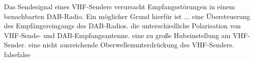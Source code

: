     {Das Sendesignal eines VHF-Senders verursacht Empfangsstörungen in einem benachbarten DAB-Radio. Ein möglicher Grund hierfür ist ...}
    {eine Übersteuerung des Empfängereingangs des DAB-Radios.}
    {die unterschiedliche Polarisation von VHF-Sende- und DAB-Empfangsantenne.}
    {eine zu große Hubeinstellung am VHF-Sender.}
    {eine nicht ausreichende Oberwellenunterdrückung des VHF-Senders.}
    {false}{false}